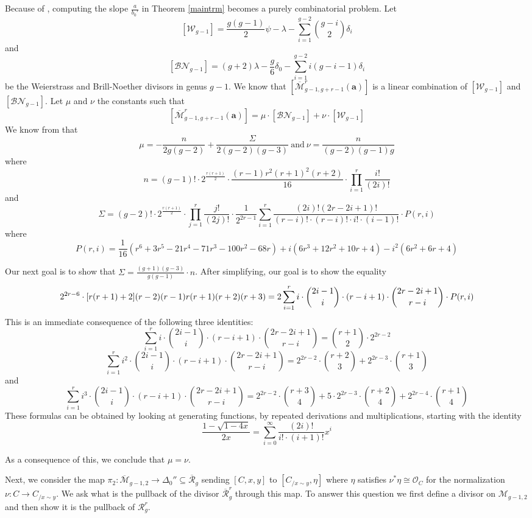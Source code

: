 \documentclass{article}
\theoremstyle{plain}
\theoremstyle{definition}
\def\cM{\mathcal{M}}
\def\cR{\mathcal{R}}
\def\rr{\overline{\mathcal{R}}}
\def\mm{\overline{\mathcal{M}}}
\begin{document}
Because of \cite{FarkasCastel}, computing the slope $\frac{a}{b_0'}$ in Theorem \ref{maintrm} becomes a purely combinatorial problem. Let 
\[ [\mathcal{W}_{g-1}] = \frac{g(g-1)}{2}\psi - \lambda - \sum_{i=1}^{g-2} \binom{g-i}{2} \delta_i  \]
and 
\[ [\mathcal{BN}_{g-1}] = (g+2)\lambda - \frac{g}{6}\delta_0 - \sum_{i=1}^{g-2} i(g-i-1)\delta_i\]
be the Weierstrass and Brill-Noether divisors in genus $g-1$. We know that $[\mm^r_{g-1,g+r-1}(\textbf{a})]$ is a linear combination of $[\mathcal{W}_{g-1}]$ and $[\mathcal{BN}_{g-1}]$. Let $\mu$ and $\nu$ the constants such that 
\[ [\mm^r_{g-1,g+r-1}(\textbf{a})] = \mu\cdot [\mathcal{BN}_{g-1}] + \nu \cdot[\mathcal{W}_{g-1}]\]
We know from \cite[Corollary 1 and Formula (6)]{FarkasCastel} that 
\[ \mu = -\frac{n}{2g(g-2)} + \frac{\Sigma}{2(g-2)(g-3)} \ \mathrm{and} \ \nu = \frac{n}{(g-2)(g-1)g}\]  
where 
\[ n = (g-1)!\cdot 2^{\frac{r(r+1)}{2}}\cdot \frac{(r-1)r^2(r+1)^2(r+2)}{16}\cdot \prod_{i=1}^r\frac{i!}{(2i)!} \]
and 
\[ \Sigma = (g-2)!\cdot 2^{\frac{r(r+1)}{2}}\cdot \prod_{j=1}^{r}\frac{j!}{(2j)!}\cdot \frac{1}{2^{2r-1}}\sum_{i=1}^r\frac{(2i)!(2r-2i+1)!}{(r-i)!\cdot (r-i)!\cdot i!\cdot (i-1)!}\cdot P(r,i) \]
where 
\[ P(r,i) = \frac{1}{16}(r^6+3r^5-21r^4-71r^3-100r^2-68r) + i(6r^3+12r^2+10r+4) -i^2(6r^2+6r+4) \]

Our next goal is to show that $ \Sigma = \frac{(g+1)(g-3)}{g(g-1)}\cdot n$. After simplifying, our goal is to show the equality 
\[ 2^{2r-6}\cdot \text{\large [}r(r+1)+2\text{\large]}(r-2)(r-1)r(r+1)(r+2)(r+3) = 2\sum_{i=1}^ri\cdot\binom{2i-1}{i}\cdot(r-i+1)\cdot\binom{2r-2i+1}{r-i}\cdot P(r,i)\]
This is an immediate consequence of the following three identities: 
\[ \sum_{i=1}^{r}i\cdot \binom{2i-1}{i}\cdot(r-i+1)\cdot \binom{2r-2i+1}{r-i} = \binom{r+1}{2}\cdot 2^{2r-2} \] 
\[ \sum_{i=1}^{r}i^2\cdot \binom{2i-1}{i}\cdot(r-i+1)\cdot \binom{2r-2i+1}{r-i} = 2^{2r-2}\cdot\binom{r+2}{3} + 2^{2r-3}\cdot \binom{r+1}{3}\]
and 
\[\sum_{i=1}^{r}i^3\cdot \binom{2i-1}{i}\cdot(r-i+1)\cdot \binom{2r-2i+1}{r-i} = 2^{2r-2}\cdot \binom{r+3}{4} + 5\cdot2^{2r-3}\cdot\binom{r+2}{4} + 2^{2r-4}\cdot\binom{r+1}{4}\]
These formulas can be obtained by looking at generating functions, by repeated derivations and multiplications, starting with the identity 
\[ \frac{1-\sqrt{1-4x}}{2x} = \sum_{i=0}^\infty \frac{(2i)!}{i!\cdot(i+1)!}x^i\]

As a consequence of this, we conclude that $\mu = \nu$.

Next, we consider the map $\pi_2\colon \mm_{g-1,2} \rightarrow \Delta_0''\subseteq \rr_g$ sending $[C,x,y]$ to $[C_{/x\sim y}, \eta]$ where $\eta$ satisfies $\nu^*\eta \cong \mathcal{O}_C$ for the normalization $\nu\colon C\rightarrow C_{/x\sim y}$. We ask what is the pullback of the divisor $\rr_g^r$ through this map. To answer this question we first define a divisor on $\cM_{g-1,2}$ and then show it is the pullback of $\cR_g^r$. 
\end{document}
